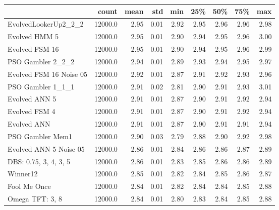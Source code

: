 \begin{tabular}{lrrrrrrrr}
\toprule
{} &    count &  mean &   std &   min &   25\% &   50\% &   75\% &   max \\
\midrule
EvolvedLookerUp2\_2\_2    &  12000.0 &  2.95 &  0.01 &  2.92 &  2.95 &  2.96 &  2.96 &  2.98 \\
Evolved HMM 5           &  12000.0 &  2.95 &  0.01 &  2.90 &  2.94 &  2.95 &  2.96 &  3.00 \\
Evolved FSM 16          &  12000.0 &  2.95 &  0.01 &  2.90 &  2.94 &  2.95 &  2.96 &  2.99 \\
PSO Gambler 2\_2\_2       &  12000.0 &  2.94 &  0.01 &  2.89 &  2.93 &  2.94 &  2.95 &  2.97 \\
Evolved FSM 16 Noise 05 &  12000.0 &  2.92 &  0.01 &  2.87 &  2.91 &  2.92 &  2.93 &  2.96 \\
PSO Gambler 1\_1\_1       &  12000.0 &  2.91 &  0.02 &  2.81 &  2.90 &  2.91 &  2.93 &  3.01 \\
Evolved ANN 5           &  12000.0 &  2.91 &  0.01 &  2.87 &  2.90 &  2.91 &  2.92 &  2.94 \\
Evolved FSM 4           &  12000.0 &  2.91 &  0.01 &  2.87 &  2.90 &  2.91 &  2.92 &  2.94 \\
Evolved ANN             &  12000.0 &  2.91 &  0.01 &  2.87 &  2.90 &  2.91 &  2.91 &  2.94 \\
PSO Gambler Mem1        &  12000.0 &  2.90 &  0.03 &  2.79 &  2.88 &  2.90 &  2.92 &  2.98 \\
Evolved ANN 5 Noise 05  &  12000.0 &  2.86 &  0.01 &  2.84 &  2.86 &  2.86 &  2.87 &  2.89 \\
DBS: 0.75, 3, 4, 3, 5   &  12000.0 &  2.86 &  0.01 &  2.83 &  2.85 &  2.86 &  2.86 &  2.89 \\
Winner12                &  12000.0 &  2.85 &  0.01 &  2.82 &  2.84 &  2.85 &  2.86 &  2.87 \\
Fool Me Once            &  12000.0 &  2.84 &  0.01 &  2.82 &  2.84 &  2.84 &  2.85 &  2.88 \\
Omega TFT: 3, 8         &  12000.0 &  2.84 &  0.01 &  2.80 &  2.83 &  2.84 &  2.85 &  2.88 \\
\bottomrule
\end{tabular}
